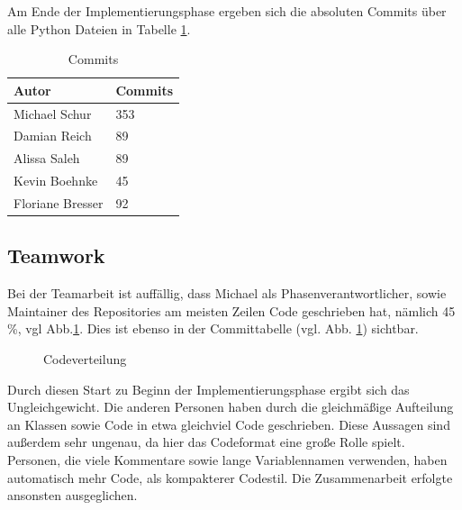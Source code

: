 \documentclass{article}
\begin{document}
Am Ende der Implementierungsphase ergeben sich die absoluten Commits über alle Python Dateien in Tabelle \ref{tb: commits_overall}.

\begin{table}[]
\centering
\begin{tabular}{ll}
Autor            & Commits \\ \hline
Michael Schur    & 353     \\
Damian Reich     & 89      \\
Alissa Saleh     & 89      \\
Kevin Boehnke    & 45      \\
Floriane Bresser & 92     
\label{tb: commits_overall}
\end{tabular}
\caption{Commits}
\end{table}



\subsection{Teamwork}

Bei der Teamarbeit ist auffällig, dass Michael als Phasenverantwortlicher, sowie Maintainer des Repositories am meisten Zeilen Code geschrieben hat, nämlich 45 \%, vgl Abb.\ref{fig:teamwork}. Dies ist ebenso in der Committabelle (vgl. Abb. \ref{tb: commits_overall}) sichtbar.

\begin{figure}
\centering
{} 
\caption{Codeverteilung} \label{fig:teamwork}
\end{figure}

Durch diesen Start zu Beginn der Implementierungsphase ergibt sich das Ungleichgewicht. Die anderen Personen haben durch die gleichmäßige Aufteilung an Klassen sowie Code in etwa gleichviel Code geschrieben. Diese Aussagen sind außerdem sehr ungenau, da hier das Codeformat eine große Rolle spielt. Personen, die viele Kommentare sowie lange Variablennamen verwenden, haben automatisch mehr Code, als kompakterer Codestil.
Die Zusammenarbeit erfolgte ansonsten ausgeglichen.

\clearpage
\printunsrtglossary
\end{document}

